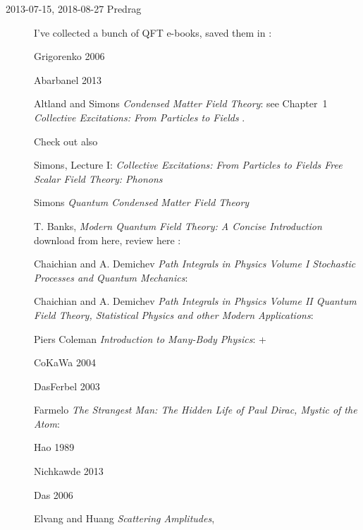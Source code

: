 \begin{description}
\item[2013-07-15, 2018-08-27 Predrag]
I've collected a bunch of QFT e-books, saved
them in :

Grigorenko 2006 

Abarbanel 2013 

Altland and Simons
{\em Condensed Matter Field Theory}:
see Chapter~1 {\em Collective Excitations: From
Particles to Fields} .

Check out also

 {Simons},
Lecture I:
{\em Collective Excitations:  From Particles to Fields
Free Scalar Field Theory:  Phonons}

Simons
{\em Quantum Condensed Matter Field Theory}

T. Banks,
{\em Modern Quantum Field Theory: A Concise Introduction}
download from
 {here},
review  {here} :\\

Chaichian and A. Demichev
{\em Path Integrals in Physics
Volume I
Stochastic Processes and Quantum Mechanics}:

Chaichian and A. Demichev
{\em Path Integrals in Physics
Volume  II
Quantum Field Theory, Statistical Physics and other Modern Applications}:

{Piers Coleman} {\em Introduction to Many-Body Physics}:
 + 

CoKaWa 2004 

DasFerbel 2003 

Farmelo
{\em The Strangest Man: The Hidden Life of Paul Dirac, Mystic of the Atom}:

Hao 1989 

Nichkawde 2013 

Das 2006 

Elvang and Huang {\em Scattering Amplitudes}, 


\end{description}
